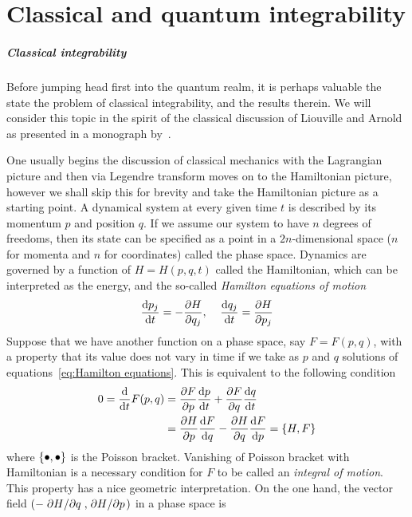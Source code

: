 \chapter{Classical and quantum integrability\label{app:int}}
\thispagestyle{chapterBeginStyle}

\paragraph{Classical integrability}Before jumping head first into the quantum realm, it is perhaps valuable the state
the problem of classical integrability, and the results therein.
We will consider this topic in the spirit of the classical discussion
of Liouville and Arnold as presented in a monograph by~\textcite{Gutzwiller1991}.

One usually begins the discussion of classical mechanics with the Lagrangian picture and then
via Legendre transform moves on to the Hamiltonian picture, however we shall skip this
for brevity and take the Hamiltonian picture as a starting point.
A dynamical system at every given time \(t\) is described by its momentum \(p\) and
position \(q\). If we assume our system to have \(n\) degrees of freedoms, then
its state can be specified as a point in a \(2n\)-dimensional space (\(n\) for momenta and
\(n\) for coordinates) called the phase space. Dynamics are governed by a function
of \(H = H(p,q,t)\) called the Hamiltonian, which can be interpreted as the energy,
and the so-called \textit{Hamilton equations of motion}
\begin{equation}
    \dv{p_j}{t} = -\pdv{H}{q_j},\; \; \; \; \dv{q_j}{t} = \pdv{H}{p_j}
    \label{eq:Hamilton equations}
\end{equation} 
Suppose that we have another function on a phase space, say \(F=F(p,q)\), with
a property that its value does not vary in time if we take as \(p\) and \(q\) solutions
of equations~\eqref{eq:Hamilton equations}. This is equivalent to the following condition
\begin{align}
    0 = \dv{}{t}F(p,q) &= \pdv{F}{p} \dv{p}{t} + \pdv{F}{q}\dv{q}{t} \nonumber{}\\
    &= \pdv{H}{p}\dv{F}{q} - \pdv{H}{q}\dv{F}{p} = \poissonbracket{H}{F}
\end{align}
where \(\poissonbracket{\bullet }{\bullet }\) is the Poisson bracket.
Vanishing of Poisson bracket with Hamiltonian is a necessary condition for \(F\)
to be called an \textit{integral of motion}. This property has a nice geometric interpretation.
On the one hand, the vector field \(\left(-\pdv*{H}{q},\pdv*{H}{p}\right)\) in a phase space is
